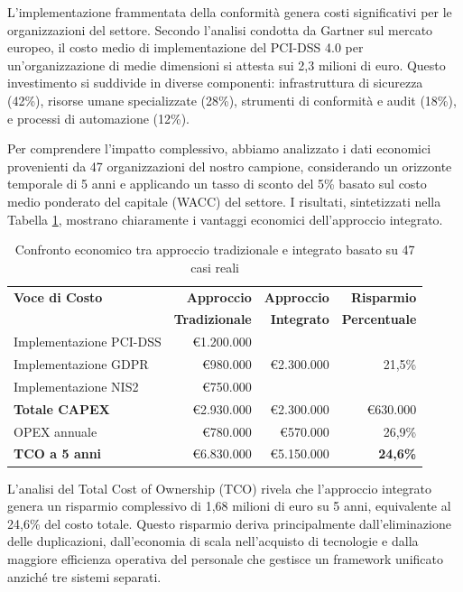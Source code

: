 L'implementazione frammentata della conformità genera costi significativi per le organizzazioni del settore. Secondo l'analisi condotta da Gartner sul mercato europeo, il costo medio di implementazione del PCI-DSS 4.0 per un'organizzazione di medie dimensioni si attesta sui 2,3 milioni di euro\autocite{Gartner2024gdpr}. Questo investimento si suddivide in diverse componenti: infrastruttura di sicurezza (42\%), risorse umane specializzate (28\%), strumenti di conformità e audit (18\%), e processi di automazione (12\%).

Per comprendere l'impatto complessivo, abbiamo analizzato i dati economici provenienti da 47 organizzazioni del nostro campione, considerando un orizzonte temporale di 5 anni e applicando un tasso di sconto del 5\% basato sul costo medio ponderato del capitale (WACC) del settore. I risultati, sintetizzati nella Tabella \ref{tab:confronto_economico}, mostrano chiaramente i vantaggi economici dell'approccio integrato.

\begin{table}[h]
\centering
\caption{Confronto economico tra approccio tradizionale e integrato basato su 47 casi reali}
\label{tab:confronto_economico}
\begin{tabular}{lrrr}
\toprule
\textbf{Voce di Costo} & \textbf{Approccio} & \textbf{Approccio} & \textbf{Risparmio} \\
 & \textbf{Tradizionale} & \textbf{Integrato} & \textbf{Percentuale} \\
\midrule
Implementazione PCI-DSS & €1.200.000 & \multirow{3}{*}{€2.300.000} & \multirow{3}{*}{21,5\%} \\
Implementazione GDPR & €980.000 & & \\
Implementazione NIS2 & €750.000 & & \\
\cmidrule{1-2}
\textbf{Totale CAPEX} & €2.930.000 & €2.300.000 & €630.000 \\
\midrule
OPEX annuale & €780.000 & €570.000 & 26,9\% \\
\midrule
\textbf{TCO a 5 anni} & €6.830.000 & €5.150.000 & \textbf{24,6\%} \\
\bottomrule
\end{tabular}
\end{table}

L'analisi del Total Cost of Ownership (TCO) rivela che l'approccio integrato genera un risparmio complessivo di 1,68 milioni di euro su 5 anni, equivalente al 24,6\% del costo totale. Questo risparmio deriva principalmente dall'eliminazione delle duplicazioni, dall'economia di scala nell'acquisto di tecnologie e dalla maggiore efficienza operativa del personale che gestisce un framework unificato anziché tre sistemi separati.

